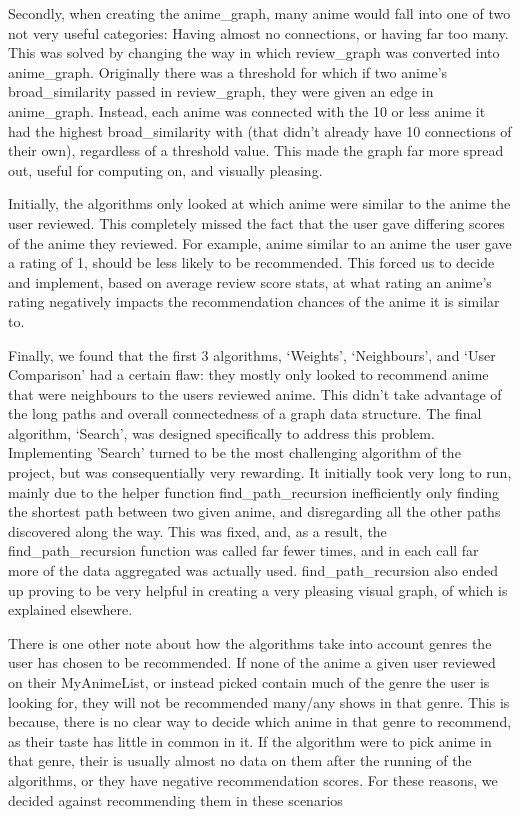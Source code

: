 \documentclass[fontsize=11pt]{article}
\begin{document}
\item[]Secondly, when creating the anime\_graph, many anime would fall into one of two not very useful categories: Having almost no connections, or having far too many. This was solved by changing the way in which review\_graph was converted into anime\_graph. Originally there was a threshold for which if two anime’s broad\_similarity passed in review\_graph, they were given an edge in anime\_graph. Instead, each anime was connected with the 10 or less anime it had the highest broad\_similarity with (that didn’t already have 10 connections of their own), regardless of a threshold value. This made the graph far more spread out, useful for computing on, and visually pleasing.

\item[]Initially, the algorithms only looked at which anime were similar to the anime the user reviewed. This completely missed the fact that the user gave differing scores of the anime they reviewed. For example, anime similar to an anime the user gave a rating of 1, should be less likely to be recommended. This forced us to decide and implement, based on average review score stats, at what rating an anime’s rating negatively impacts the recommendation chances of the anime it is similar to.

\item[]Finally, we found that the first 3 algorithms, ‘Weights’, ‘Neighbours’, and ‘User Comparison’ had a certain flaw: they mostly only looked to recommend anime that were neighbours to the users reviewed anime. This didn’t take advantage of the long paths and overall connectedness of a graph data structure. The final algorithm, ‘Search’, was designed specifically to address this problem. Implementing 'Search' turned to be the most challenging algorithm of the project, but was consequentially very rewarding. It initially took very long to run, mainly due to the helper function find\_path\_recursion inefficiently only finding the shortest path between two given anime, and disregarding all the other paths discovered along the way. This was fixed, and, as a result, the find\_path\_recursion function was called far fewer times, and in each call far more of the data aggregated was actually used. find\_path\_recursion also ended up proving to be very helpful in creating a very pleasing visual graph, of which is explained elsewhere.

\item[]There is one other note about how the algorithms take into account genres the user has chosen to be recommended. If none of the anime a given user reviewed on their MyAnimeList, or instead picked contain much of the genre the user is looking for, they will not be recommended many/any shows in that genre. This is because, there is no clear way to decide which anime in that genre to recommend, as their taste has little in common in it. If the algorithm were to pick anime in that genre, their is usually almost no data on them after the running of the algorithms, or they have negative recommendation scores. For these reasons, we decided against recommending them in these scenarios
\end{document}
